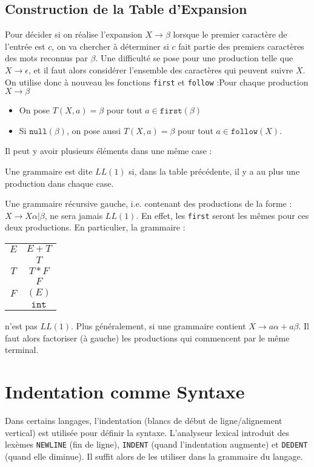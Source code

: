 \documentclass{cours}
\begin{document}
\subsection{Construction de la Table d'Expansion}
Pour décider si on réalise l'expansion $X\rightarrow\beta$ lorsque le premier caractère de l'entrée est $c$, on va chercher à déterminer si $c$ fait partie des premiers caractères des mots reconnus par $\beta$. Une difficulté se pose pour une production telle que $X\rightarrow\epsilon$, et il faut alors considérer l'ensemble des caractères qui peuvent suivre $X$. On utilise donc à nouveau les fonctions \texttt{first} et \texttt{follow} :Pour chaque production $X \rightarrow\beta$
\begin{itemize}
    \item On pose $T(X, a) = \beta$ pour tout $a \in \texttt{first}(\beta)$
    \item Si $\texttt{null}(\beta)$, on pose aussi $T(X, a) = \beta$ pour tout $a\in \texttt{follow}(X)$.
\end{itemize}
Il peut y avoir plusieurs éléments dans une même case : 
\begin{definition}
    Une grammaire est dite $LL(1)$ si, dans la table précédente, il y a au plus une production dans chaque case. 
\end{definition}
Une grammaire récursive gauche, i.e. contenant des productions de la forme : $X\rightarrow X\alpha | \beta$, ne sera jamais $LL(1)$. En effet, les \texttt{first} seront les mêmes pour ces deux productions. En particulier, la grammaire :
\begin{tabular}{c@{$\rightarrow$}c}
    $E$ & $E + T$\\
    & $T$\\
    $T$ & $T * F$\\
    & $F$\\
    $F$ & $( E )$\\
    & $\texttt{int}$\\
\end{tabular}
n'est pas $LL(1)$. Plus généralement, si une grammaire contient $X \rightarrow a\alpha + a\beta$. Il faut alors factoriser (à gauche) les productions qui commencent par le même terminal.

\section{Indentation comme Syntaxe}
Dans certains langages, l'indentation (blancs de début de ligne/alignement vertical) est utilisée pour définir la syntaxe. L'analyseur lexical introduit des lexèmes \texttt{NEWLINE} (fin de ligne), \texttt{INDENT} (quand l'indentation augmente) et \texttt{DEDENT} (quand elle diminue). Il suffit alors de les utiliser dans la grammaire du langage. 
\end{document}
